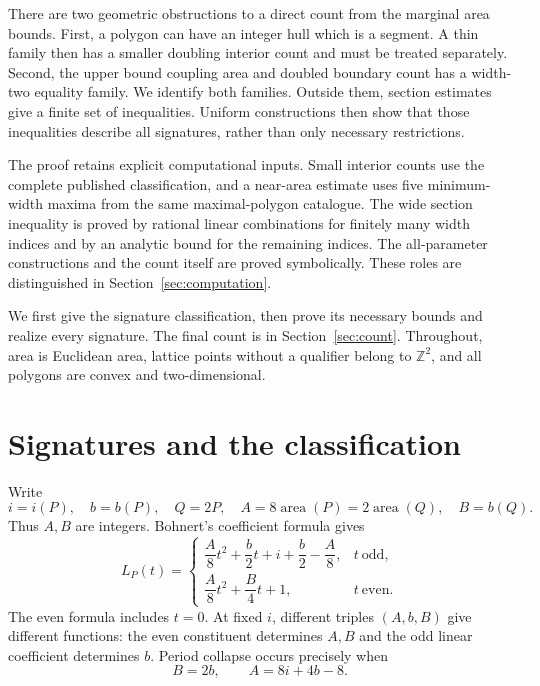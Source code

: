 \documentclass[11pt]{article}
\newcommand{\Z}{\mathbb Z}
\newcommand{\area}{\operatorname{area}}
\begin{document}
There are two geometric obstructions to a direct count from the marginal
area bounds. First, a polygon can have an integer hull which is a segment.
A thin family then has a smaller doubling interior count and must be treated
separately. Second, the upper bound coupling area and doubled boundary count
has a width-two equality family. We identify both families. Outside them,
section estimates give a finite set of inequalities. Uniform constructions
then show that those inequalities describe all signatures, rather than only
necessary restrictions.

The proof retains explicit computational inputs. Small interior counts use
the complete published classification, and a near-area estimate uses five
minimum-width maxima from the same maximal-polygon catalogue. The wide
section inequality is proved by rational linear combinations for finitely
many width indices and by an analytic bound for the remaining indices.
The all-parameter constructions and the count itself are proved
symbolically. These roles are distinguished in Section~\ref{sec:computation}.

We first give the signature classification, then prove its necessary bounds
and realize every signature. The final count is in Section~\ref{sec:count}.
Throughout, area is Euclidean area, lattice points without a qualifier belong
to \(\Z^2\), and all polygons are convex and two-dimensional.

\section{Signatures and the classification}\label{sec:signatures}
Write
\[
 i=i(P),\quad b=b(P),\quad Q=2P,\quad
 A=8\area(P)=2\area(Q),\quad B=b(Q).
\]
Thus \(A,B\) are integers. Bohnert's coefficient formula
\cite[Proposition 2.1]{Collapse} gives
\begin{equation}\label{eq:coeff}
 L_P(t)=
 \begin{cases}
 \dfrac A8t^2+\dfrac b2t+i+\dfrac b2-\dfrac A8,&t\ \text{odd},\\[2mm]
 \dfrac A8t^2+\dfrac B4t+1,&t\ \text{even}.
 \end{cases}
\end{equation}
The even formula includes \(t=0\). At fixed \(i\), different triples
\((A,b,B)\) give different functions: the even constituent determines \(A,B\)
and the odd linear coefficient determines \(b\).
Period collapse occurs precisely when
\begin{equation}\label{eq:collapse}
 B=2b,\qquad A=8i+4b-8.
\end{equation}
\end{document}
